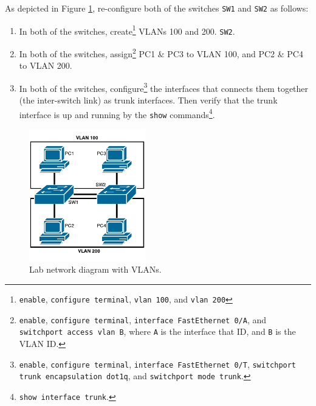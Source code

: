 \documentclass[pdftex,12pt,a4paper]{article}
\begin{document}
            As depicted in Figure \ref{fig:netdiag2}, re-configure both of the
            switches \texttt{SW1} and \texttt{SW2} as follows:
            \begin{enumerate}
                \item In both of the switches, create\footnote{\texttt{enable},
                        \texttt{configure terminal},
                    \texttt{vlan 100}, and \texttt{vlan 200}} VLANs 100 and 200.
                    \texttt{SW2}.
                \item In both of the switches, assign\footnote{\texttt{enable},
                        \texttt{configure terminal},
                    \texttt{interface FastEthernet 0/A}, and \texttt{switchport
                    access vlan B}, where \texttt{A} is the interface that ID, and
                    \texttt{B} is the VLAN ID.} PC1 \& PC3 to VLAN 100, and PC2 \& PC4 to
                    VLAN 200.
                \item In both of the switches,
                    configure\footnote{\texttt{enable}, \texttt{configure
                    terminal},
                    \texttt{interface FastEthernet 0/T}, \texttt{switchport
                    trunk encapsulation dot1q}, and \texttt{switchport mode
                    trunk}.} the interfaces that
                    connects them together (the inter-switch link) as trunk
                    interfaces. Then verify that the trunk interface is up and
                    running by the \texttt{show} commands\footnote{\texttt{show
                    interface trunk}.}.
            \end{enumerate}

            \begin{figure}[tbh]
                \centering
                \includegraphics[width=0.45\textwidth]{figures/netdiag2}
                \caption{Lab network diagram with VLANs.}
                \label{fig:netdiag2}
            \end{figure}
\end{document}
